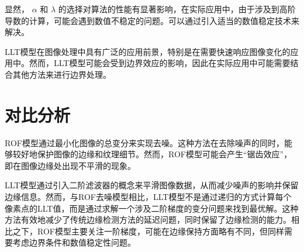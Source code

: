 显然， $\alpha$ 和 $\lambda$ 的选择对算法的性能有显著影响，在实际应用中，由于涉及到高阶导数的计算，可能会遇到数值不稳定的问题。可以通过引入适当的数值稳定技术来解决。

LLT模型在图像处理中具有广泛的应用前景，特别是在需要快速响应图像变化的应用中。然而，LLT模型可能会受到边界效应的影响，因此在实际应用中可能需要结合其他方法来进行边界处理。

\section{对比分析}
ROF模型通过最小化图像的总变分来实现去噪。这种方法在去除噪声的同时，能够较好地保护图像的边缘和纹理细节。然而，ROF模型可能会产生“锯齿效应”，即在图像边缘处出现不平滑的现象。

LLT模型通过引入二阶滤波器的概念来平滑图像数据，从而减少噪声的影响并保留边缘信息。然而，与ROF去噪模型相比，LLT模型不是通过递归的方式计算每个像素点的LLT值，而是通过求解一个涉及二阶梯度的变分问题来找到最优解。这种方法有效地减少了传统边缘检测方法的延迟问题，同时保留了边缘检测的能力。相比之下，ROF模型主要关注一阶梯度，可能在边缘保持方面略有不同，但同样需要考虑边界条件和数值稳定性问题。
